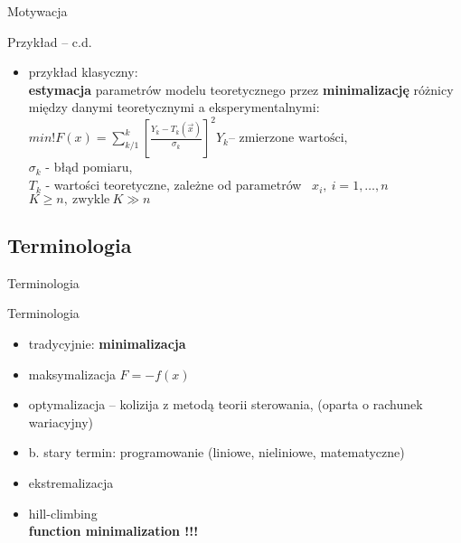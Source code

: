   \begin{frame}{Motywacja}
    \begin{exampleblock}{Przykład -- c.d.}
      \begin{itemize}
        \item przykład klasyczny:\\
        \textbf{estymacja} parametrów modelu teoretycznego
        przez \textbf{minimalizację} różnicy między danymi
        teoretycznymi a eksperymentalnymi:\\
        $
          min!F(x) = \sum_{k/1}^{k} \left[ \frac{Y_k - T_k(\vec x)}{\sigma_k}
          \right] ^2 Y_k \text{-- zmierzone wartości,}
        $ \\
        $ \sigma_k $ - błąd pomiaru,\\
        $ T_k $ - wartości teoretyczne, zależne od parametrów~
        $ x_i{,}\ i=1{,} \dots {,}n $ \\
        $ K \geq n{,}\ \text{zwykle}\ K \gg n $
      \end{itemize}
    \end{exampleblock}

  \end{frame}

\subsection{Terminologia}

  \begin{frame}{Terminologia}
    \begin{block}{Terminologia}
      \begin{itemize}
        \item tradycyjnie: \textbf{minimalizacja}
        \item maksymalizacja $ F = -f(x)$
        \item optymalizacja -- kolizija z metodą teorii
        sterowania, (oparta o rachunek wariacyjny)
        \item b. stary termin: programowanie (liniowe,
        nieliniowe, matematyczne)
        \item ekstremalizacja
        \item hill-climbing \\
        \textbf{function minimalization !!!}
      \end{itemize}
    \end{block}

  \end{frame}

